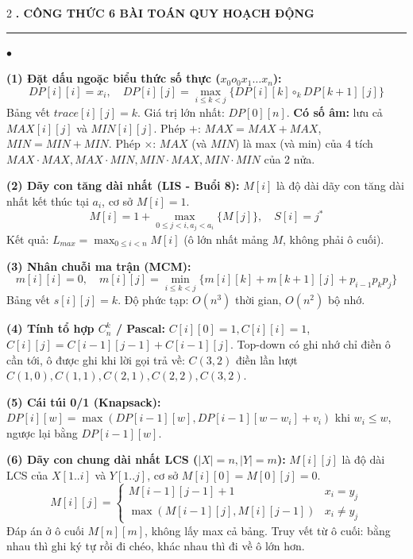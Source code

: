\documentclass[9pt,a4paper]{article}
\def\labelitemi{$\bullet$}
\renewenvironment{itemize}{%
  \begin{list}{\labelitemi}{%
    \setlength{\topsep}{0pt}%
    \setlength{\partopsep}{0pt}%
    \setlength{\itemsep}{0pt}%
    \setlength{\parsep}{0pt}%
    \setlength{\leftmargin}{10pt}%
  }%
}{\end{list}}
\newcommand{\mysec}[1]{\vspace{2pt}\textbf{\fontsize{9.5}{10.5}\selectfont #1}\vspace{1pt}\hrule\vspace{2pt}}
\begin{document}
\begin{multicols*}{2}
\mysec{2. CÔNG THỨC 6 BÀI TOÁN QUY HOẠCH ĐỘNG}
\begin{itemize}
  \item \textbf{(1) Đặt dấu ngoặc biểu thức số thực ($x_0 o_0 x_1 \dots x_n$):}
    $$DP[i][i] = x_i, \quad DP[i][j] = \max_{i \le k < j} \{ DP[i][k] \circ_k DP[k+1][j] \}$$
    Bảng vết $trace[i][j]=k$. Giá trị lớn nhất: $DP[0][n]$.
    \textbf{Có số âm:} lưu cả $MAX[i][j]$ và $MIN[i][j]$. Phép $+$: $MAX = MAX + MAX$, $MIN = MIN + MIN$. Phép $\times$: $MAX$ (và $MIN$) là max (và min) của 4 tích $MAX \cdot MAX, MAX \cdot MIN, MIN \cdot MAX, MIN \cdot MIN$ của 2 nửa.
  \item \textbf{(2) Dãy con tăng dài nhất (LIS - Buổi 8):} $M[i]$ là độ dài dãy con tăng dài nhất kết thúc tại $a_i$, cơ sở $M[i] = 1$.
    $$M[i] = 1 + \max_{0 \le j < i, a_j < a_i} \{ M[j] \}, \quad S[i] = j^*$$
    Kết quả: $L_{max} = \max_{0 \le i < n} M[i]$ (ô lớn nhất mảng $M$, không phải ô cuối).
  \item \textbf{(3) Nhân chuỗi ma trận (MCM):}
    $$m[i][i] = 0, \quad m[i][j] = \min_{i \le k < j} \{ m[i][k] + m[k+1][j] + p_{i-1}p_kp_j \}$$
    Bảng vết $s[i][j]=k$. Độ phức tạp: $O(n^3)$ thời gian, $O(n^2)$ bộ nhớ.
  \item \textbf{(4) Tính tổ hợp $C_n^k$ / Pascal:} $C[i][0]=1, C[i][i]=1$, $C[i][j] = C[i-1][j-1] + C[i-1][j]$. Top-down có ghi nhớ chỉ điền ô cần tới, ô được ghi khi lời gọi trả về: $C(3,2)$ điền lần lượt $C(1,0), C(1,1), C(2,1), C(2,2), C(3,2)$.
  \item \textbf{(5) Cái túi 0/1 (Knapsack):} $DP[i][w] = \max(DP[i-1][w], DP[i-1][w-w_i] + v_i)$ khi $w_i \le w$, ngược lại bằng $DP[i-1][w]$.
  \item \textbf{(6) Dãy con chung dài nhất LCS ($|X| = n, |Y| = m$):} $M[i][j]$ là độ dài LCS của $X[1..i]$ và $Y[1..j]$, cơ sở $M[i][0] = M[0][j] = 0$.
    $$M[i][j] = \begin{cases} M[i-1][j-1] + 1 & x_i = y_j \\ \max(M[i-1][j], M[i][j-1]) & x_i \ne y_j \end{cases}$$
    Đáp án ở ô cuối $M[n][m]$, không lấy max cả bảng. Truy vết từ ô cuối: bằng nhau thì ghi ký tự rồi đi chéo, khác nhau thì đi về ô lớn hơn.
\end{itemize}


\end{multicols*}
\end{document}
